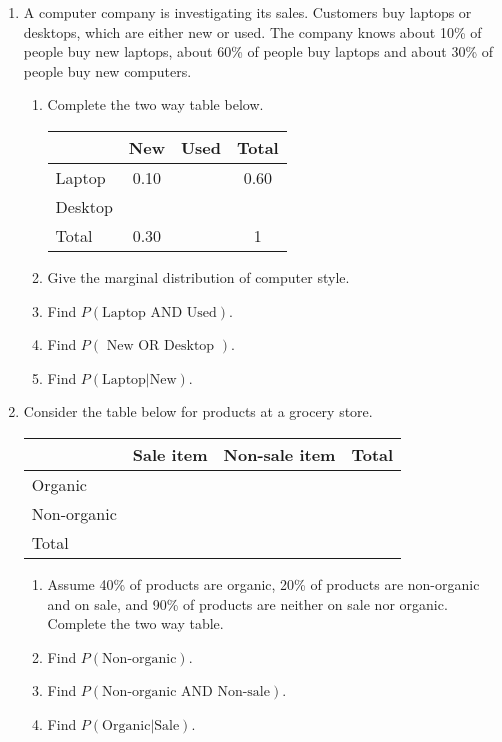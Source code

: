 \begin{enumerate}
 \item A computer company is investigating its sales. Customers buy laptops or desktops, which are either new or used. The company knows about 10\% of people buy new laptops, about 60\% of people buy laptops and about 30\% of people buy new computers.
 \begin{enumerate}
 \item Complete the two way table below.
  
  \begin{center}
  \begin{tabular}{l|cc|c}
  & New & Used & Total \\ \hline
  Laptop & 0.10 & & 0.60 \\
  Desktop & & & \\ \hline
  Total & 0.30 & & 1
  \end{tabular}
  \end{center}
  
 \item Give the marginal distribution of computer style.
 \item Find \( P(\text{Laptop AND Used}) \).
 \item Find \( P( \text{ New OR Desktop } ) \).
 \item Find \( P( \text{Laptop} | \text{New} ) \).
 \end{enumerate}
 \item Consider the table below for products at a grocery store.

\begin{center}
 \begin{tabular}{l|cc|c}
  & Sale item & Non-sale item & Total \\ \hline
  Organic &  & &  \\
  Non-organic & & & \\ \hline
  Total &  & & 
 \end{tabular}
\end{center}
  \begin{enumerate}
  \item Assume 40\% of products are organic, 20\% of products are non-organic and on sale, and 90\% of products are neither on sale nor organic.  Complete the two way table.  
  \item Find \( P(\text{Non-organic}) \).
  \item Find \( P(\text{Non-organic AND Non-sale}) \).
  \item Find \( P(\text{Organic} | \text{Sale}) \).
  \end{enumerate}
\end{enumerate}